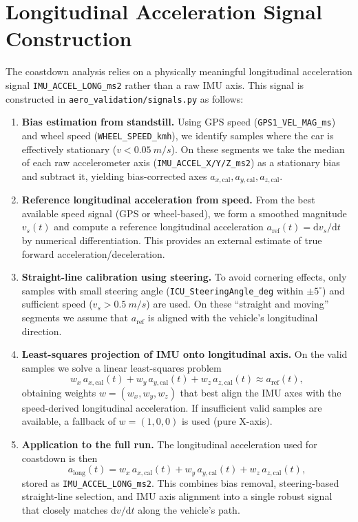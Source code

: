 \documentclass[11pt,a4paper]{article}
\begin{document}
\section{Longitudinal Acceleration Signal Construction}
The coastdown analysis relies on a physically meaningful longitudinal acceleration signal \texttt{IMU\_ACCEL\_LONG\_ms2} rather than a raw IMU axis. This signal is constructed in \texttt{aero\_validation/signals.py} as follows:
\begin{enumerate}
  \item \textbf{Bias estimation from standstill.} Using GPS speed (\texttt{GPS1\_VEL\_MAG\_ms}) and wheel speed (\texttt{WHEEL\_SPEED\_kmh}), we identify samples where the car is effectively stationary ($v < \SI{0.05}{m/s}$). On these segments we take the median of each raw accelerometer axis (\texttt{IMU\_ACCEL\_X/Y/Z\_ms2}) as a stationary bias and subtract it, yielding bias-corrected axes $a_{x,\text{cal}}, a_{y,\text{cal}}, a_{z,\text{cal}}$.
  \item \textbf{Reference longitudinal acceleration from speed.} From the best available speed signal (GPS or wheel-based), we form a smoothed magnitude $v_s(t)$ and compute a reference longitudinal acceleration $a_\text{ref}(t) = \mathrm{d}v_s/\mathrm{d}t$ by numerical differentiation. This provides an external estimate of true forward acceleration/deceleration.
  \item \textbf{Straight-line calibration using steering.} To avoid cornering effects, only samples with small steering angle (\texttt{ICU\_SteeringAngle\_deg} within \(\pm 5^\circ\)) and sufficient speed ($v_s > \SI{0.5}{m/s}$) are used. On these ``straight and moving'' segments we assume that $a_\text{ref}$ is aligned with the vehicle's longitudinal direction.
  \item \textbf{Least-squares projection of IMU onto longitudinal axis.} On the valid samples we solve a linear least-squares problem
  \begin{equation}
    w_x\,a_{x,\text{cal}}(t) + w_y\,a_{y,\text{cal}}(t) + w_z\,a_{z,\text{cal}}(t) \approx a_\text{ref}(t),
  \end{equation}
  obtaining weights $w = (w_x, w_y, w_z)$ that best align the IMU axes with the speed-derived longitudinal acceleration. If insufficient valid samples are available, a fallback of $w = (1, 0, 0)$ is used (pure X-axis).
  \item \textbf{Application to the full run.} The longitudinal acceleration used for coastdown is then
  \begin{equation}
    a_\text{long}(t) = w_x\,a_{x,\text{cal}}(t) + w_y\,a_{y,\text{cal}}(t) + w_z\,a_{z,\text{cal}}(t),
  \end{equation}
  stored as \texttt{IMU\_ACCEL\_LONG\_ms2}. This combines bias removal, steering-based straight-line selection, and IMU axis alignment into a single robust signal that closely matches $\mathrm{d}v/\mathrm{d}t$ along the vehicle's path.
\end{enumerate}
\end{document}
